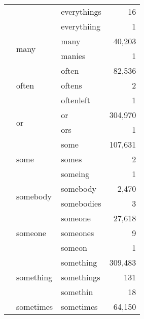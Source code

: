 \begin{longtable}[ht]{lllr}
 &  & everythings & {\cellcolor[HTML]{E6E6FA}} \color[HTML]{000000} 16 \\
 &  & everythiing & {\cellcolor[HTML]{E6E6FA}} \color[HTML]{000000} 1 \\
\cline{2-4}
 & \multirow[c]{2}{*}{many} & many & {\cellcolor[HTML]{E9BFF5}} \color[HTML]{000000} 40,203 \\
 &  & manies & {\cellcolor[HTML]{E6E6FA}} \color[HTML]{000000} 1 \\
\cline{2-4}
 & \multirow[c]{3}{*}{often} & often & {\cellcolor[HTML]{EC96F0}} \color[HTML]{000000} 82,536 \\
 &  & oftens & {\cellcolor[HTML]{E6E6FA}} \color[HTML]{000000} 2 \\
 &  & oftenleft & {\cellcolor[HTML]{E6E6FA}} \color[HTML]{000000} 1 \\
\cline{2-4}
 & \multirow[c]{2}{*}{or} & or & {\cellcolor[HTML]{4D0082}} \color[HTML]{F1F1F1} 304,970 \\
 &  & ors & {\cellcolor[HTML]{E6E6FA}} \color[HTML]{000000} 1 \\
\cline{2-4}
 & \multirow[c]{3}{*}{some} & some & {\cellcolor[HTML]{E97CE9}} \color[HTML]{F1F1F1} 107,631 \\
 &  & somes & {\cellcolor[HTML]{E6E6FA}} \color[HTML]{000000} 2 \\
 &  & someing & {\cellcolor[HTML]{E6E6FA}} \color[HTML]{000000} 1 \\
\cline{2-4}
 & \multirow[c]{2}{*}{somebody} & somebody & {\cellcolor[HTML]{E6E4FA}} \color[HTML]{000000} 2,470 \\
 &  & somebodies & {\cellcolor[HTML]{E6E6FA}} \color[HTML]{000000} 3 \\
\cline{2-4}
 & \multirow[c]{3}{*}{someone} & someone & {\cellcolor[HTML]{E8CCF7}} \color[HTML]{000000} 27,618 \\
 &  & someones & {\cellcolor[HTML]{E6E6FA}} \color[HTML]{000000} 9 \\
 &  & someon & {\cellcolor[HTML]{E6E6FA}} \color[HTML]{000000} 1 \\
\cline{2-4}
 & \multirow[c]{3}{*}{something} & something & {\cellcolor[HTML]{4B0082}} \color[HTML]{F1F1F1} 309,483 \\
 &  & somethings & {\cellcolor[HTML]{E6E6FA}} \color[HTML]{000000} 131 \\
 &  & somethin & {\cellcolor[HTML]{E6E6FA}} \color[HTML]{000000} 18 \\
\cline{2-4}
 & sometimes & sometimes & {\cellcolor[HTML]{EBA8F3}} \color[HTML]{000000} 64,150 \\
\cline{1-4} \cline{2-4}
\end{longtable}
